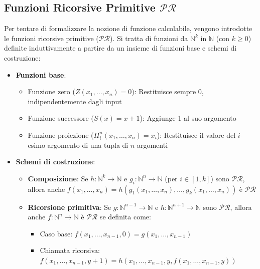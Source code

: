 \documentclass[12pt, a4paper]{report}
\begin{document}
            \subsection{Funzioni Ricorsive Primitive $\mathcal{PR}$}
                Per tentare di formalizzare la nozione di funzione calcolabile, vengono introdotte le funzioni ricorsive primitive ($\mathcal{PR}$). Si tratta di funzioni da $\mathbb{N}^k$ in $\mathbb{N}$ (con $k \ge 0$) definite induttivamente a partire da un insieme di funzioni base e schemi di costruzione:
                \begin{itemize}
                    \item \textbf{Funzioni base}: \begin{itemize}
                        \item Funzione zero ($Z(x_1, \dots, x_n) = 0$): Restituisce sempre 0, indipendentemente dagli input
                        \item Funzione successore ($S(x) = x+1$): Aggiunge 1 al suo argomento
                        \item Funzione proiezione ($\Pi^n_i(x_1, \dots, x_n) = x_i$): Restituisce il valore del $i$-esimo argomento di una tupla di $n$ argomenti
                    \end{itemize}
                    \item \textbf{Schemi di costruzione}: \begin{itemize}
                        \item \textbf{Composizione}: Se $h: \mathbb{N}^k \to \mathbb{N}$ e $g_i: \mathbb{N}^n \to \mathbb{N}$ (per $i \in [1, k]$) sono $\mathcal{PR}$, allora anche $f(x_1, \dots, x_n) = h(g_1(x_1, \dots, x_n), \dots, g_k(x_1, \dots, x_n))$ è $\mathcal{PR}$
                        \item \textbf{Ricorsione primitiva}: Se $g: \mathbb{N}^{n-1} \to \mathbb{N}$ e $h: \mathbb{N}^{n+1} \to \mathbb{N}$ sono $\mathcal{PR}$, allora anche $f: \mathbb{N}^n \to \mathbb{N}$ è $\mathcal{PR}$ se definita come: \begin{itemize}
                            \item Caso base: $f(x_1, \dots, x_{n-1}, 0) = g(x_1, \dots, x_{n-1})$
                            \item Chiamata ricorsiva: $f(x_1, \dots, x_{n-1}, y+1) = h(x_1, \dots, x_{n-1}, y, f(x_1, \dots, x_{n-1}, y))$
                        \end{itemize}
                    \end{itemize}
                \end{itemize}
\end{document}

